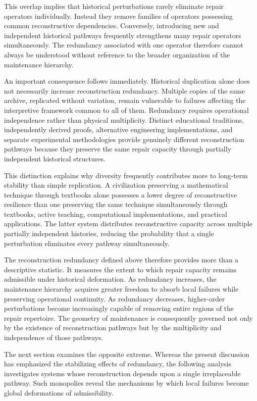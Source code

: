 \documentclass[12pt,oneside]{article}
\theoremstyle{plain}
\theoremstyle{definition}
\theoremstyle{remark}
\theoremstyle{plain}
\begin{document}
This overlap implies that historical perturbations rarely eliminate repair operators individually.
Instead they remove families of operators possessing common reconstructive dependencies.
Conversely, introducing new and independent historical pathways frequently strengthens many repair
operators simultaneously. The redundancy associated with one operator therefore cannot always be
understood without reference to the broader organization of the maintenance hierarchy.

An important consequence follows immediately. Historical duplication alone does not necessarily
increase reconstruction redundancy. Multiple copies of the same archive, replicated without
variation, remain vulnerable to failures affecting the interpretive framework common to all of
them. Redundancy requires operational independence rather than physical multiplicity. Distinct
educational traditions, independently derived proofs, alternative engineering implementations, and
separate experimental methodologies provide genuinely different reconstruction pathways because they
preserve the same repair capacity through partially independent historical structures.

This distinction explains why diversity frequently contributes more to long-term stability than
simple replication. A civilization preserving a mathematical technique through textbooks alone
possesses a lower degree of reconstructive resilience than one preserving the same technique
simultaneously through textbooks, active teaching, computational implementations, and practical
applications. The latter system distributes reconstructive capacity across multiple partially
independent histories, reducing the probability that a single perturbation eliminates every pathway
simultaneously.

The reconstruction redundancy defined above therefore provides more than a descriptive statistic.
It measures the extent to which repair capacity remains admissible under historical deformation. As
redundancy increases, the maintenance hierarchy acquires greater freedom to absorb local failures
while preserving operational continuity. As redundancy decreases, higher-order perturbations become
increasingly capable of removing entire regions of the repair repertoire. The geometry of
maintenance is consequently governed not only by the existence of reconstruction pathways but by
the multiplicity and independence of those pathways.

The next section examines the opposite extreme. Whereas the present discussion has emphasized the
stabilizing effects of redundancy, the following analysis investigates systems whose reconstruction
depends upon a single irreplaceable pathway. Such monopolies reveal the mechanisms by which local
failures become global deformations of admissibility.
\end{document}

